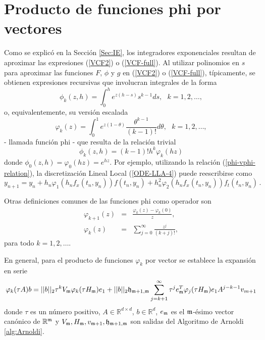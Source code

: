 \section{Producto de funciones phi por vectores}\label{section:phi-times-vector}

Como se explicó en la Sección \ref{Sec:IE}, los integradores exponenciales resultan de aproximar las expresiones (\ref{VCF2}) o (\ref{VCF-full}). Al utilizar polinomios en $s$ para aproximar las funciones $F$, $\phi$ y $g$ en (\ref{VCF2}) o (\ref{VCF-full}), típicamente, se obtienen expresiones recursivas que involucran integrales de la forma
\begin{equation*}
\phi _{k}(z,h)=\int_{0}^{h}e^{z(h-s)}s^{k-1}ds,\text{ \ \ \ \ \ \ \ }%
k=1,2,\ldots ,
\end{equation*}%
o, equivalentemente, su versión escalada
\begin{equation*}
\varphi _{k}(z)=\int_{0}^{1}e^{z(1-\theta )}\frac{\theta ^{k-1}}{(k-1)!}%
d\theta ,\text{ \ \ \ \ \ \ \ }k=1,2,\ldots ,
\end{equation*}%
- llamada función phi - que resulta de la relación trivial 
\begin{equation}
	\phi _{k}(z,h)=(k-1)!h^{k}\varphi_{k}(hz) \label{phi-vphi-relation}
\end{equation} 
donde $\phi _{0}(z,h)=\varphi _{0}(hz)=e^{hz}$. Por ejemplo, utilizando la relación (\ref{phi-vphi-relation}), la discretización Lineal Local (\ref{ODE-LLA-4})
puede reescribirse como
\begin{equation}
		y_{n+1}=y_{n}+h_n\varphi_1(h_nf_x(t_n,y_n))f(t_n,y_n) + h_n^2\varphi_2(h_nf_x(t_n,y_n))f_t(t_n,y_n)  \, . 
\end{equation}


Otras definiciones comunes de las funciones phi como operador son \cite{Saad92}
\begin{eqnarray}\label{phi-definition}
\varphi_{k+1}(z) &=& \frac{\varphi_k(z)-\varphi_k(0)}{z}, \label{DEF-PHI}\\
\varphi_k(z) & = &\sum\limits_{j=0}^{\infty}\frac{z^{j}}{(k+j)!}, \nonumber 
\end{eqnarray}
para todo $k=1,2,\ldots$.

En general, para el producto de funciones $\varphi_k$ por vector se establece la expansión en serie \cite{Saad92,sidje1998expokit}
\begin{equation} \label{PHI-EXPANSION}
	\varphi_k(\tau A)b=||b||_2\tau^{k} V_{\mathfrak{m}} \varphi_k(\tau H_{\mathfrak{m}})e_1 + ||b||_2\mathfrak{h}_{\mathfrak{m}+1,\mathfrak{m}}
	\sum_{j=k+1}^{\infty}\tau^{j} e_{\mathfrak{m}}^T\varphi_j(\tau H_{\mathfrak{m}})e_1A^{j-k-1}v_{m+1}
\end{equation}
donde $\tau$ es un número positivo, $A\in\mathbb{R}^{d\times d}$, $b\in\mathbb{R}^d$, $e_{\mathfrak{m}}$ es el $\mathfrak{m}$-ésimo vector canónico de $\mathbb{R}^{\mathfrak{m}}$ y $V_{\mathfrak{m}},H_{\mathfrak{m}},v_{\mathfrak{m}+1},\mathfrak{h}_{\mathfrak{m}+1,\mathfrak{m}}$ son salidas del Algoritmo de Arnoldi \ref{alg:Arnoldi}.

